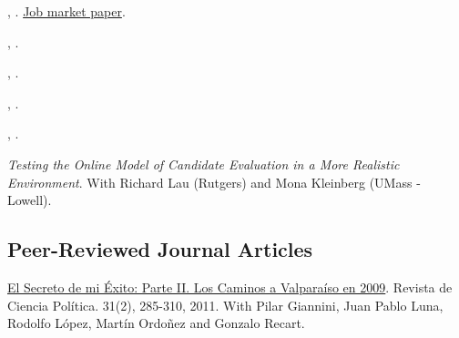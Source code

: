 \documentclass[letterpaper]{article}
\renewenvironment{itemize}{
  \begin{list}{}{
    \setlength{\leftmargin}{1.5em}
  }
}{
  \end{list}
}
\begin{document}
\begin{itemize}
  
  \item[$\bullet$]  \href{https://github.com/hbahamonde/Earthquake_Paper/raw/master/Bahamonde_Earthquake_Paper.pdf}{\unskip}, {\bf \emph{\unskip}}. \underline{Job market paper}.

  \item[$\bullet$] \href{http://github.com/hbahamonde/IncomeTaxAdoption/raw/master/Bahamonde_IncomeTaxAdoption.pdf}{\unskip}, {\bf \emph{\unskip}}.
  
  \item[$\bullet$] \href{http://github.com/hbahamonde/Clientelism_paper/raw/master/Bahamonde_Clientelism_Paper.pdf}{\unskip}, {\bf \emph{\unskip}}.
  
  \item[$\bullet$] \href{https://github.com/hbahamonde/Vote_Selling/blob/master/Bahamonde_VoteSellingUS.pdf}{\unskip}, {\bf \emph{\unskip}}.
  
  \item[$\bullet$] \href{https://github.com/hbahamonde/Negative_Link_Paper/raw/master/Bahamonde_NegativeLink.pdf}{\unskip}, {\bf \emph{\unskip}}.
  
  \item[$\bullet$] \emph{Testing the Online Model of Candidate Evaluation in a More Realistic Environment}. With Richard Lau (Rutgers) and Mona Kleinberg (UMass - Lowell).
\end{itemize}


\subsection*{Peer-Reviewed Journal Articles}

\begin{itemize}
  \item[$\bullet$] \href{http://www.revistacienciapolitica.cl/rcp/wp-content/uploads/2013/09/07_vol_31_2.pdf}{El Secreto de mi \'Exito: Parte II. Los Caminos a Valpara\'iso en 2009}. Revista de Ciencia Pol\'itica. 31(2), 285-310, 2011. With Pilar Giannini, Juan Pablo Luna, Rodolfo L\'opez, Mart\'in Ordo\~nez and Gonzalo Recart.
\end{itemize}
\end{document}
